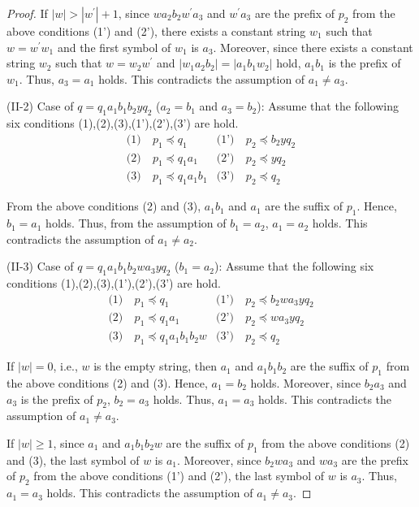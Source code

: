 \begin{proof}
If $|w| > |w^{\prime}|+1$, since $wa_{2}b_{2}w^{\prime}a_{3}$ and $w^{\prime}a_{3}$ are the prefix of $p_{2}$ from the above conditions (1') and (2'),
there exists a constant string $w_{1}$ such that $w=w^{\prime}w_{1}$ and the first symbol of $w_{1}$ is $a_{3}$.
Moreover, since there exists a constant string $w_{2}$ such that $w=w_{2}w^{\prime}$ and $|w_{1}a_{2}b_{2}|=|a_{1}b_{1}w_{2}|$ hold,
$a_{1}b_{1}$ is the prefix of $w_{1}$.
Thus, $a_{3}=a_{1}$ holds.
This contradicts the assumption of $a_{1} \ne a_{3}$.
\smallskip

\noindent
(II-2) Case of $q=q_{1}a_{1}b_{1}b_{2}yq_{2}$ ($a_{2}=b_{1}$ and $a_{3}=b_{2}$):
Assume that the following six conditions (1),(2),(3),(1'),(2'),(3') are hold.
\begin{align*}
\textrm{(1)}~& p_{1} \preceq q_{1} & \textrm{(1')}~& p_{2} \preceq b_{2}yq_{2} \\
\textrm{(2)}~& p_{1} \preceq q_{1}a_{1} & \textrm{(2')}~& p_{2} \preceq yq_{2} \\
\textrm{(3)}~& p_{1} \preceq q_{1}a_{1}b_{1} & \textrm{(3')}~& p_{2} \preceq q_{2}
\end{align*}

\noindent
From the above conditions (2) and (3), $a_{1}b_{1}$ and $a_{1}$ are the suffix of $p_{1}$.
Hence, $b_{1}=a_{1}$ holds.
Thus, from the assumption of $b_{1}=a_{2}$, $a_{1}=a_{2}$ holds.
This contradicts the assumption of $a_{1} \ne a_{2}$.
\smallskip

\noindent
(II-3) Case of $q=q_{1}a_{1}b_{1}b_{2}wa_{3}yq_{2}$ ($b_{1}=a_{2}$):
Assume that the following six conditions (1),(2),(3),(1'),(2'),(3') are hold.
\begin{align*}
\textrm{(1)}~& p_{1} \preceq q_{1} & \textrm{(1')}~& p_{2} \preceq b_{2}wa_{3}yq_{2} \\
\textrm{(2)}~& p_{1} \preceq q_{1}a_{1} & \textrm{(2')}~& p_{2} \preceq wa_{3}yq_{2} \\
\textrm{(3)}~& p_{1} \preceq q_{1}a_{1}b_{1}b_{2}w & \textrm{(3')}~& p_{2} \preceq q_{2}
\end{align*}

If $|w|=0$, i.e., $w$ is the empty string, then $a_{1}$ and $a_{1}b_{1}b_{2}$ are the suffix of $p_{1}$ from the above conditions (2) and (3).
Hence, $a_{1}=b_{2}$ holds.
Moreover, since $b_{2}a_{3}$ and $a_{3}$ is the prefix of $p_{2}$, $b_{2}=a_{3}$ holds.
Thus, $a_{1}=a_{3}$ holds.
This contradicts the assumption of $a_{1} \ne a_{3}$.

If $|w| \ge 1$, since $a_{1}$ and $a_{1}b_{1}b_{2}w$ are the suffix of $p_{1}$ from the above conditions (2) and (3),
the last symbol of $w$ is $a_{1}$.
Moreover, since $b_{2}wa_{3}$ and $wa_{3}$ are the prefix of $p_{2}$ from the above conditions (1') and (2'),
the last symbol of $w$ is $a_{3}$.
Thus, $a_{1}=a_{3}$ holds.
This contradicts the assumption of $a_{1} \ne a_{3}$.
\smallskip


\end{proof}
